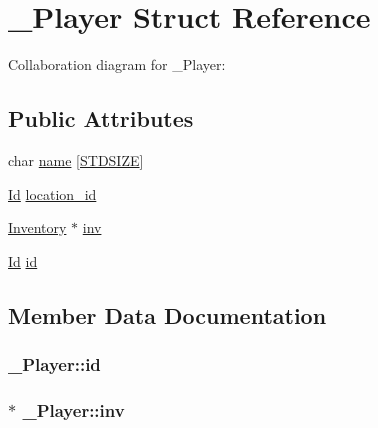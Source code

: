 \hypertarget{struct__Player}{}\section{\+\_\+\+Player Struct Reference}
\label{struct__Player}


Collaboration diagram for \+\_\+\+Player\+:
\subsection*{Public Attributes}
\begin{DoxyCompactItemize}
\item 
char \hyperlink{struct__Player_abd3fbad9568ff1e608654d58e71b8c58}{name} \mbox{[}\hyperlink{types_8h_a431b1676533a0e1714aff7d6a5542406}{S\+T\+D\+S\+I\+ZE}\mbox{]}
\item 
\hyperlink{types_8h_a845e604fb28f7e3d97549da3448149d3}{Id} \hyperlink{struct__Player_aca2cb83e7a18dea36c33ad94e36a1e54}{location\+\_\+id}
\item 
\hyperlink{inventory_8h_a2253bf64ac4ce6a9c1d6f39c0b0d32a3}{Inventory} $\ast$ \hyperlink{struct__Player_aaaeeb03326c37ce62c333c2b94fde23c}{inv}
\item 
\hyperlink{types_8h_a845e604fb28f7e3d97549da3448149d3}{Id} \hyperlink{struct__Player_a60d635cd063816a9c1bd873f4868bb90}{id}
\end{DoxyCompactItemize}


\subsection{Member Data Documentation}
\subsubsection[{\texorpdfstring{id}{id}}]{ \+\_\+\+Player\+::id}\hypertarget{struct__Player_a60d635cd063816a9c1bd873f4868bb90}{}\label{struct__Player_a60d635cd063816a9c1bd873f4868bb90}
\subsubsection[{\texorpdfstring{inv}{inv}}]{$\ast$ \+\_\+\+Player\+::inv}\hypertarget{struct__Player_aaaeeb03326c37ce62c333c2b94fde23c}{}\label{struct__Player_aaaeeb03326c37ce62c333c2b94fde23c}

